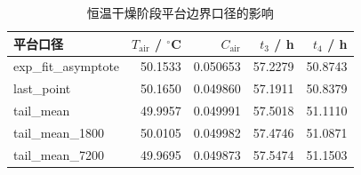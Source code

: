 \begin{table}[H]
\centering
\caption{恒温干燥阶段平台边界口径的影响}
\label{tab:plat}
\footnotesize
\begin{tabular}{@{}lrrrr@{}}
\toprule
平台口径 & $T_{\mathrm{air}}$ / $^\circ$C & $C_{\mathrm{air}}$ & $t_3$ / h & $t_4$ / h \\
\midrule
exp\_fit\_asymptote & 50.1533 & 0.050653 & 57.2279 & 50.8743 \\
last\_point & 50.1650 & 0.049860 & 57.1911 & 50.8379 \\
tail\_mean & 49.9957 & 0.049991 & 57.5018 & 51.1110 \\
tail\_mean\_1800 & 50.0105 & 0.049982 & 57.4746 & 51.0871 \\
tail\_mean\_7200 & 49.9695 & 0.049873 & 57.5474 & 51.1503 \\
\bottomrule
\end{tabular}
\end{table}
